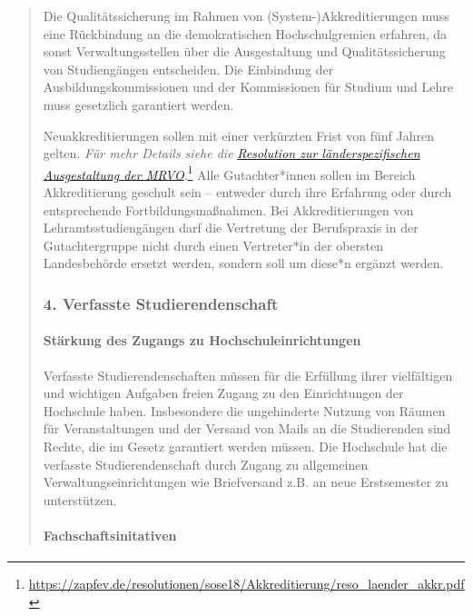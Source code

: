\documentclass[DIV=14]{scrartcl}
\begin{document}
\begin{quote}
Die Qualitätssicherung im Rahmen von (System-)Akkreditierungen muss eine Rückbindung an die demokratischen Hochschulgremien erfahren, da sonst Verwaltungsstellen über die Ausgestaltung und Qualitätssicherung von Studiengängen entscheiden. Die Einbindung der Ausbildungskommissionen und der Kommissionen für Studium und Lehre muss gesetzlich garantiert werden.

Neuakkreditierungen sollen mit einer verkürzten Frist von fünf Jahren
gelten. \emph{Für mehr Details siehe die }\href{https://zapfev.de/resolutionen/sose18/Akkreditierung/reso_laender_akkr.pdf}{\emph{Resolution zur länderspezifischen Ausgestaltung der MRVO}}.\footnote{\url{https://zapfev.de/resolutionen/sose18/Akkreditierung/reso_laender_akkr.pdf}} Alle Gutachter*innen sollen im Bereich Akkreditierung geschult sein -- entweder durch ihre Erfahrung oder durch entsprechende Fortbildungsmaßnahmen. Bei Akkreditierungen von Lehramtsstudiengängen darf die Vertretung der Berufspraxis in der Gutachtergruppe nicht durch einen Vertreter*in der obersten Landesbehörde ersetzt werden, sondern soll um diese*n ergänzt werden.


\hypertarget{verfasste-studierendenschaft}{%
\subsubsection*{4. Verfasste Studierendenschaft}\label{verfasste-studierendenschaft}}

\hypertarget{stuxe4rkung-des-zugangs-zu-hochschuleinrichtungen}{%
\paragraph{Stärkung des Zugangs zu Hochschuleinrichtungen}\label{stuxe4rkung-des-zugangs-zu-hochschuleinrichtungen}}

Verfasste Studierendenschaften müssen für die Erfüllung ihrer
vielfältigen und wichtigen Aufgaben freien Zugang zu den Einrichtungen der Hochschule haben. Insbesondere die ungehinderte Nutzung von Räumen für Veranstaltungen und der Versand von Mails an die Studierenden sind Rechte, die im Gesetz garantiert werden müssen. Die Hochschule hat die verfasste Studierendenschaft durch Zugang zu allgemeinen Verwaltungseinrichtungen wie Briefversand z.B. an neue Erstsemester zu unterstützen.

\hypertarget{fachschaftsinitativen}{%
\paragraph{Fachschaftsinitativen}\label{fachschaftsinitativen}}


\end{quote}
\end{document}
